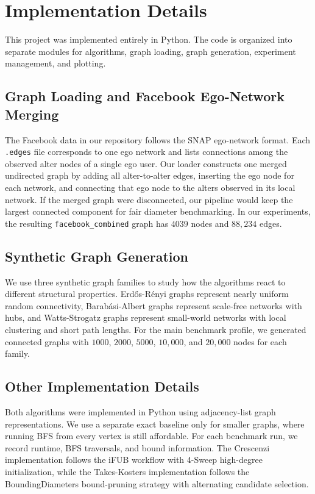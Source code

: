 \documentclass[11pt,a4paper]{article}
\begin{document}
\section{Implementation Details}

This project was implemented entirely in Python. The code is organized into
separate modules for algorithms, graph loading, graph generation, experiment
management, and plotting.

\subsection{Graph Loading and Facebook Ego-Network Merging}
The Facebook data in our repository follows the SNAP ego-network format. Each
\texttt{.edges} file corresponds to one ego network and lists connections among
the observed alter nodes of a single ego user. Our loader constructs one merged
undirected graph by adding all alter-to-alter edges, inserting the ego node for
each network, and connecting that ego node to the alters observed in its local
network. If the merged graph were disconnected, our pipeline would keep the
largest connected component for fair diameter benchmarking. In our experiments,
the resulting \texttt{facebook\_combined} graph has $4039$ nodes and $88{,}234$
edges.

\subsection{Synthetic Graph Generation}
We use three synthetic graph families to study how the algorithms react to
different structural properties. Erd\H{o}s-R\'enyi graphs represent nearly
uniform random connectivity, Barab\'asi-Albert graphs represent scale-free
networks with hubs, and Watts-Strogatz graphs represent small-world networks
with local clustering and short path lengths. For the main benchmark profile,
we generated connected graphs with $1000$, $2000$, $5000$, $10{,}000$, and
$20{,}000$ nodes for each family.

\subsection{Other Implementation Details}
Both algorithms were implemented in Python using adjacency-list graph
representations. We use a separate exact baseline only for smaller graphs,
where running BFS from every vertex is still affordable. For each benchmark
run, we record runtime, BFS traversals, and bound information. The Crescenzi
implementation follows the iFUB workflow with 4-Sweep high-degree
initialization, while the Takes-Kosters implementation follows the
BoundingDiameters bound-pruning strategy with alternating candidate selection.
\end{document}
